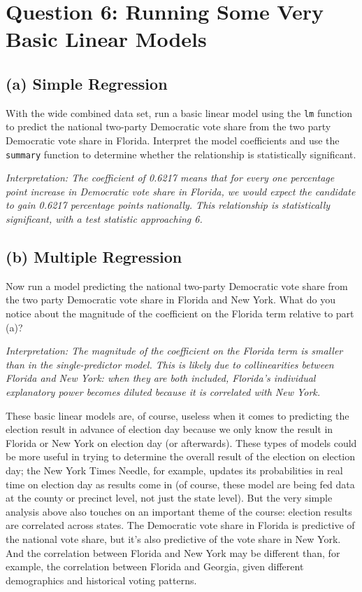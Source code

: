 \documentclass[
]{article}
\begin{document}
\section{Question 6: Running Some Very Basic Linear
Models}\label{question-6-running-some-very-basic-linear-models}

\subsection{(a) Simple Regression}\label{a-simple-regression}

With the wide combined data set, run a basic linear model using the
\texttt{lm} function to predict the national two-party Democratic vote
share from the two party Democratic vote share in Florida. Interpret the
model coefficients and use the \texttt{summary} function to determine
whether the relationship is statistically significant.

\emph{Interpretation: The coefficient of 0.6217 means that for every one
percentage point increase in Democratic vote share in Florida, we would
expect the candidate to gain 0.6217 percentage points nationally. This
relationship is statistically significant, with a test statistic
approaching 6.}

\subsection{(b) Multiple Regression}\label{b-multiple-regression}

Now run a model predicting the national two-party Democratic vote share
from the two party Democratic vote share in Florida and New York. What
do you notice about the magnitude of the coefficient on the Florida term
relative to part (a)?

\emph{Interpretation: The magnitude of the coefficient on the Florida
term is smaller than in the single-predictor model. This is likely due
to collinearities between Florida and New York: when they are both
included, Florida's individual explanatory power becomes diluted because
it is correlated with New York.}

These basic linear models are, of course, useless when it comes to
predicting the election result in advance of election day because we
only know the result in Florida or New York on election day (or
afterwards). These types of models could be more useful in trying to
determine the overall result of the election on election day; the New
York Times Needle, for example, updates its probabilities in real time
on election day as results come in (of course, these model are being fed
data at the county or precinct level, not just the state level). But the
very simple analysis above also touches on an important theme of the
course: election results are correlated across states. The Democratic
vote share in Florida is predictive of the national vote share, but it's
also predictive of the vote share in New York. And the correlation
between Florida and New York may be different than, for example, the
correlation between Florida and Georgia, given different demographics
and historical voting patterns.
\end{document}
